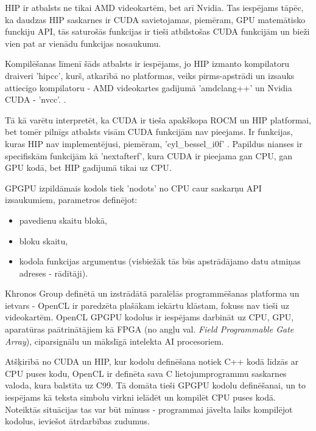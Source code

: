 HIP ir atbalsts ne tikai AMD videokartēm, bet arī Nvidia. Tas iespējams tāpēc, ka 
daudzas HIP saskarnes ir CUDA savietojamas, piemēram, GPU matemātisko funckiju API, tās saturošās funkcijas
ir tieši atbilstošas CUDA funkcijām un bieži vien pat ar vienādu funkcijas nosaukumu.
\cite{HIP_math_API,CUDA_math_API}

Kompilēšanas līmenī šāds atbalsts ir iespējams, jo HIP izmanto kompilatoru draiveri 'hipcc', kurš,
atkarībā no platformas, veiks pirms-apstrādi un izsauks attiecīgo kompilatoru -
AMD videokartes gadījumā 'amdclang++' un Nvidia CUDA - 'nvcc'. \cite{HIP_compilers}.

Tā kā varētu interpretēt, ka CUDA ir tieša apakškopa ROCM un HIP platformai, bet tomēr pilnīgs atbalsts
visām CUDA funkcijām nav pieejams. Ir funkcijas, kuras HIP nav implementējusi, piemēram,
'cyl\_bessel\_i0f' \cite{HIP_math_API}. Papildus nianses ir specifiskām funkcijām kā 'nextafterf', kura CUDA
ir pieejama gan CPU, gan GPU kodā, bet HIP gadījumā tikai uz CPU. \cite{HIP_math_API}

GPGPU izpildāmais kodols tiek 'nodots' no CPU caur saskarņu API izsaukumiem,
parametros definējot:
\begin{itemize}
    \item pavedienu skaitu blokā,
    \item bloku skaitu,
    \item kodola funkcijas argumentus (visbiežāk tās būs apstrādājamo datu
        atmiņas adreses - rādītāji). \cite{GPGPU_gramata}
\end{itemize}


Khronos Group definētā un izstrādātā paralēlās programmēšanas platforma un
ietvars - OpenCL ir paredzēta plašākam iekārtu klāstam, fokuss nav tieši uz
videokartēm. OpenCL GPGPU kodolus ir iespējams darbināt uz CPU, GPU,
aparatūras paātrinātājiem kā FPGA (no angļu val. \textit{Field Programmable Gate
Array}), ciparsignālu un mākslīgā intelekta AI procesoriem. \cite{opencl-spec}

Atšķirībā no CUDA un HIP, kur kodolu definēšana notiek C++ kodā līdzās ar CPU
puses kodu, OpenCL ir definēta sava C lietojumprogrammu saskarnes valoda, kura
balstīta uz C99.\cite{opencl_c_lang_spec} Tā domāta tieši GPGPU kodolu
definēšanai, un to iespējams kā teksta simbolu virkni ielādēt un kompilēt CPU
puses kodā. Noteiktās situācijas tas var būt mīnuss - programmai jāvelta laiks
kompilējot kodolus, ieviešot ātrdarbības zudumus.

